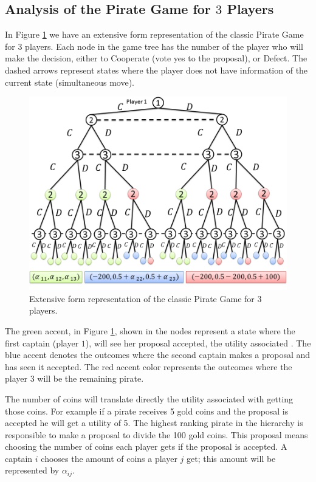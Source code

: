 \documentclass{llncs} %
\begin{document}
\subsection{Analysis of the Pirate Game for $3$ Players}
\label{subsubsec:analysis_PG3players}

In Figure \ref{fig:pg_architecturegametree:extensiveform} we have an extensive form representation of the classic Pirate Game for $3$ players. Each node in the game tree has the number of the player who will make the decision, either to Cooperate (vote yes to the proposal), or Defect. The dashed arrows represent states where the player does not have information of the current state (simultaneous move). 

\begin{figure}[h]
\centering 
\includegraphics[scale=0.40]{Figures/1.5qubit/FigurasRevistas/Slide1.png}
\caption{Extensive form representation of the classic Pirate Game for $3$ players. }
\label{fig:pg_architecturegametree:extensiveform}
\end{figure}

The green accent, in Figure \ref{fig:pg_architecturegametree:extensiveform}, shown in the nodes represent a state where the first captain (player $1$), will see her proposal accepted, the utility associated . The blue accent denotes the outcomes where the second captain makes a proposal and has seen it accepted. The red accent color represents the outcomes where the player $3$ will be the remaining pirate.

The number of coins will translate directly the utility associated with getting those coins. For example if a pirate receives 5 gold coins and the proposal is accepted he will get a utility of 5. The highest ranking pirate in the hierarchy is responsible to make a proposal to divide the 100 gold coins. This proposal means choosing the number of coins each player gets if the proposal is accepted. A captain $i$ chooses the amount of coins a player $j$ get; this amount will be represented by $\alpha_{ij}$.
\end{document}
